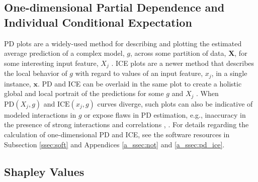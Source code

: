 \documentclass[information,article,submit,moreauthors,pdftex]{definitions/mdpi}
\begin{document}
\subsection{One-dimensional Partial Dependence and Individual Conditional Expectation}\label{ssec:pd_ice}

PD plots are a widely-used method for describing and plotting the estimated average prediction of a complex model, $g$, across some partition of data, $\mathbf{X}$, for some interesting input feature, $X_j$ \cite{esl}. ICE plots are a newer method that describes the local behavior of $g$ with regard to values of an input feature, $x_j$, in a single instance, $\mathbf{x}$. PD and ICE can be overlaid in the same plot to create a holistic global and local portrait of the predictions for some $g$ and $X_j$ \cite{ice_plots}. When $\text{PD}(X_j, g)$ and $\text{ICE}(x_j,  g)$ curves diverge, such plots can also be indicative of modeled interactions in $g$ or expose flaws in PD estimation, e.g., inaccuracy in the presence of strong interactions and correlations \cite{ice_plots}, \cite{ale_plot}.  For details regarding the calculation of one-dimensional PD and ICE, see the software resources in Subsection \ref{ssec:soft} and Appendices \ref{a_ssec:not} and \ref{a_ssec:pd_ice}.

\subsection{Shapley Values}\label{ssec:shap}
\end{document}
